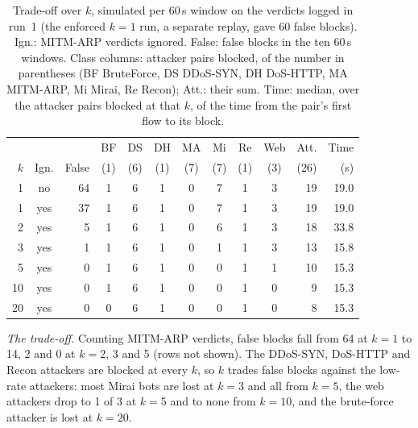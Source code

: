 \begin{table}[t]
\centering
\caption{Trade-off over $k$, simulated per 60\,s window on the verdicts logged in run~1 (the enforced $k=1$ run, a separate replay, gave 60 false blocks). Ign.: MITM-ARP verdicts ignored. False: false blocks in the ten 60\,s windows. Class columns: attacker pairs blocked, of the number in parentheses (BF BruteForce, DS DDoS-SYN, DH DoS-HTTP, MA MITM-ARP, Mi Mirai, Re Recon); Att.: their sum. Time: median, over the attacker pairs blocked at that $k$, of the time from the pair's first flow to its block.}
\label{tab:kcurve}
\footnotesize
\setlength{\tabcolsep}{2.4pt}
\begin{tabular}{rcrcccccccrr}
\hline
 & & & BF & DS & DH & MA & Mi & Re & Web & Att. & Time \\
$k$ & Ign. & False & (1) & (6) & (1) & (7) & (7) & (1) & (3) & (26) & (s) \\
\hline
1  & no  & 64 & 1 & 6 & 1 & 0 & 7 & 1 & 3 & 19 & 19.0 \\
1  & yes & 37 & 1 & 6 & 1 & 0 & 7 & 1 & 3 & 19 & 19.0 \\
2  & yes &  5 & 1 & 6 & 1 & 0 & 6 & 1 & 3 & 18 & 33.8 \\
3  & yes &  1 & 1 & 6 & 1 & 0 & 1 & 1 & 3 & 13 & 15.8 \\
5  & yes &  0 & 1 & 6 & 1 & 0 & 0 & 1 & 1 & 10 & 15.3 \\
10 & yes &  0 & 1 & 6 & 1 & 0 & 0 & 1 & 0 &  9 & 15.3 \\
20 & yes &  0 & 0 & 6 & 1 & 0 & 0 & 1 & 0 &  8 & 15.3 \\
\hline
\end{tabular}
\end{table}

\emph{The trade-off.} Counting MITM-ARP verdicts, false blocks fall from 64 at $k=1$ to 14, 2 and 0 at $k=2$, 3 and 5 (rows not shown). The DDoS-SYN, DoS-HTTP and Recon attackers are blocked at every $k$, so $k$ trades false blocks against the low-rate attackers: most Mirai bots are lost at $k=3$ and all from $k=5$, the web attackers drop to 1 of 3 at $k=5$ and to none from $k=10$, and the brute-force attacker is lost at $k=20$.

